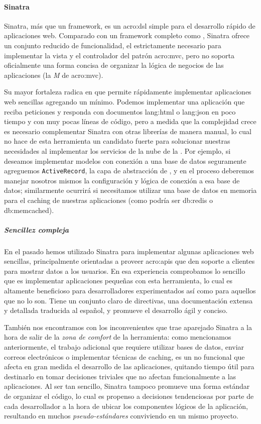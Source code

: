 \paragraph{Sinatra}
\label{soa:tecnologias:sinatra}

Sinatra, más que un framework, es un \gls{acro:dsl} simple para el desarrollo rápido de aplicaciones web. Comparado con un framework completo como , Sinatra ofrece un conjunto reducido de funcionalidad, el estrictamente necesario para implementar la vista y el controlador del patrón \gls{acro:mvc}, pero no soporta oficialmente una forma concisa de organizar la lógica de negocios de las aplicaciones (la \textit{M} de \gls{acro:mvc}).

Su mayor fortaleza radica en que permite rápidamente implementar aplicaciones web sencillas agregando un  mínimo. Podemos implementar una aplicación que reciba peticiones y responda con documentos \gls{lang:html} o \gls{lang:json} en poco tiempo y con muy pocas líneas de código, pero a medida que la complejidad crece es necesario complementar Sinatra con otras librerías de manera manual, lo cual no hace de esta herramienta un candidato fuerte para solucionar nuestras necesidades al implementar los servicios de la nube de la \unlp. Por ejemplo, si deseamos implementar modelos con conexión a una base de datos seguramente agreguemos \texttt{ActiveRecord}, la capa de abstracción de , y en el proceso deberemos manejar nosotros mismos la configuración y lógica de conexión a esa base de datos; similarmente ocurrirá si necesitamos utilizar una base de datos en memoria para el caching de nuestras aplicaciones (como podría ser \gls{db:redis} o \gls{db:memcached}).

\subparagraph{Sencillez compleja}

En el pasado hemos utilizado Sinatra para implementar algunas aplicaciones web sencillas, principalmente orientadas a proveer \glspl{acro:api} que den soporte a clientes para mostrar datos a los usuarios. En esa experiencia comprobamos lo sencillo que es implementar aplicaciones pequeñas con esta herramienta, lo cual es altamente beneficioso para desarrolladores experimentados así como para aquellos que no lo son. Tiene un conjunto claro de directivas, una documentación extensa y detallada traducida al español, y promueve el desarrollo ágil y conciso.

También nos encontramos con los inconvenientes que trae aparejado Sinatra a la hora de salir de la \textit{zona de comfort} de la herramienta: como mencionamos anteriormente, el trabajo adicional que requiere utilizar bases de datos, enviar correos electrónicos o implementar técnicas de caching, es un  no funcional que afecta en gran medida el desarrollo de las aplicaciones, quitando tiempo útil para destinarlo en tomar decisiones triviales que no afectan funcionalmente a las aplicaciones. Al ser tan sencillo, Sinatra tampoco promueve una forma estándar de organizar el código, lo cual es propenso a decisiones tendenciosas por parte de cada desarrollador a la hora de ubicar los componentes lógicos de la aplicación, resultando en muchos \textit{pseudo-estándares} conviviendo en un mismo proyecto.
